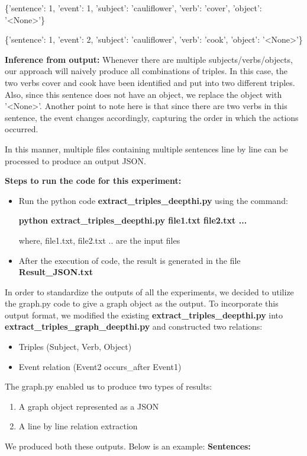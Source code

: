 \documentclass[11pt,letterpaper]{article}
\begin{document}
\begin{enumerate}
    \{'sentence': 1, 'event': 1, 'subject': 'cauliflower', 'verb': 'cover', 'object': '<None>'\}
    
    \{'sentence': 1, 'event': 2, 'subject': 'cauliflower', 'verb': 'cook', 'object': '<None>'\}
    
    \textbf{Inference from output:} 
    Whenever there are multiple subjects/verbs/objects, our approach will naively produce all combinations of triples. In this case, the two verbs cover and cook have been identified and put into two different triples. Also, since this sentence does not have an object, we replace the object with '<None>'. Another point to note here is that since there are two verbs in this sentence, the event changes accordingly, capturing the order in which the actions occurred.

\end{enumerate}

\noindent
In this manner, multiple files containing multiple sentences line by line can be processed to produce an output JSON. 

\noindent \newline
\textbf{Steps to run the code for this experiment:}
\begin{itemize}
    \item Run the python code \textbf{extract\_triples\_deepthi.py} using the command:
    
    \textbf{python extract\_triples\_deepthi.py file1.txt file2.txt ...}
    
    where, file1.txt, file2.txt .. are the input files
    
    \item After the execution of code, the result is generated in the file \textbf{Result\_JSON.txt}
\end{itemize}

\noindent
In order to standardize the outputs of all the experiments, we decided to utilize the graph.py code to give a graph object as the output. To incorporate this output format, we modified the existing \textbf{extract\_triples\_deepthi.py} into \textbf{extract\_triples\_graph\_deepthi.py} and constructed two relations:

\begin{itemize}
    \item Triples (Subject, Verb, Object)
    \item Event relation (Event2 occurs\_after Event1)
\end{itemize}

\noindent
The graph.py enabled us to produce two types of results:
\begin{enumerate}
    \item A graph object represented as a JSON 
    \item A line by line relation extraction
\end{enumerate}
\noindent
We produced both these outputs. Below is an example:
\noindent \newline
\textbf{Sentences:} 
\end{document}
